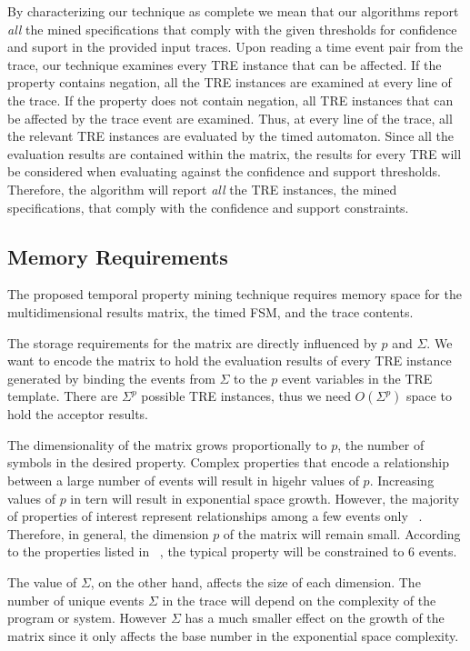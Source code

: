 \documentclass[]{sigplanconf}
\begin{document}
By characterizing our technique as complete we mean that our algorithms report \emph{all} the mined specifications that comply with the given thresholds for confidence and suport in the provided input traces. Upon reading a time event pair from the trace, our technique examines every TRE instance that can be affected. If the property contains negation, all the TRE instances are examined at every line of the trace. If the property does not contain negation, all TRE instances that can be affected by the trace event are examined. Thus, at every line of the trace, all the relevant TRE instances are evaluated by the timed automaton. Since all the evaluation results are contained within the matrix, the results for every TRE will be considered when evaluating against the confidence and support thresholds. Therefore, the algorithm will report \emph{all} the TRE instances, the mined specifications, that comply with the confidence and support constraints.


\subsection{Memory Requirements}

The proposed temporal property mining technique requires memory space for the multidimensional results matrix, the timed FSM, and the trace contents.

The storage requirements for the matrix are directly influenced by $p$ and $\Sigma$.
We want to encode the matrix to hold the evaluation results of every TRE instance generated by binding the events from $\Sigma$ to the $p$ event variables in the TRE template. There are $\Sigma^p$ possible TRE instances, thus we need $O(\Sigma^p)$ space to hold the acceptor results.

The dimensionality of the matrix grows proportionally to $p$, the number of symbols in the desired property.
Complex properties that encode a relationship between a large number of events will result in higehr values of $p$.
Increasing values of $p$ in tern will result in exponential space growth.
However, the majority of properties of interest represent relationships among a few events only ~\cite{evans1,dwyer1999patterns}.
Therefore, in general, the dimension $p$ of the matrix will remain small.
According to the properties listed in ~\cite{dwyer1999patterns}, the typical property will be constrained to 6 events.

The value of $\Sigma$, on the other hand, affects the size of each dimension.
The number of unique events $\Sigma$ in the trace will depend on the complexity of the program or system.
However $\Sigma$ has a much smaller effect on the growth of the matrix since it only affects the base number in the
exponential space complexity.
\end{document}
